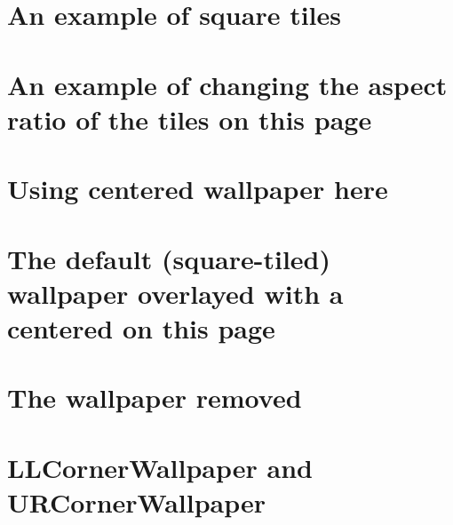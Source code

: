 \documentclass[dvipdfmx,a4paper,11pt]{tarticle}
\begin{document}
\section*{An example of square tiles}
\newpage

\section*{An example of changing the aspect ratio of the tiles on this page}
\newpage

\color{white}
\section*{Using centered wallpaper here}
\newpage

\color{black}
\section*{The default (square-tiled) wallpaper
  overlayed with a centered on this page}
\newpage

\ClearWallPaper
\section*{The wallpaper removed}
\newpage

\section*{LLCornerWallpaper and URCornerWallpaper }
\end{document}
